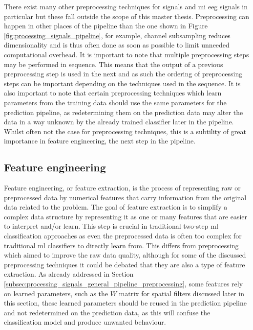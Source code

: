 There exist many other preprocessing techniques for signals and \gls{mi} \gls{eeg} signals in particular but these fall outside the scope of this master thesis.
Preprocessing can happen in other places of the pipeline than the one shown in Figure \ref{fig:processing_signals_pipeline}, for example, channel subsampling reduces dimensionality and is thus often done as soon as possible to limit unneeded computational overhead.
It is important to note that multiple preprocessing steps may be performed in sequence.
This means that the output of a previous preprocessing step is used in the next and as such the ordering of preprocessing steps can be important depending on the techniques used in the sequence.
It is also important to note that certain preprocessing techniques which learn parameters from the training data should use the same parameters for the prediction pipeline, as redetermining them on the prediction data may alter the data in a way unknown by the already trained classifier later in the pipeline.
Whilst often not the case for preprocessing techniques, this is a subtility of great importance in feature engineering, the next step in the pipeline.




\subsection{Feature engineering}
\label{subsec:processing_signals_general_pipeline_features}

Feature engineering, or feature extraction, is the process of representing raw or preprocessed data by numerical features that carry information from the original data related to the problem.
The goal of feature extraction is to simplify a complex data structure by representing it as one or many features that are easier to interpret and/or learn.
This step is crucial in traditional two-step \gls{ml} classification approaches as even the preprocessed data is often too complex for traditional \gls{ml} classifiers to directly learn from.
This differs from preprocessing which aimed to improve the raw data quality, although for some of the discussed preprocessing techniques it could be debated that they are also a type of feature extraction.
As already addressed in Section \ref{subsec:processing_signals_general_pipeline_preprocessing}, some features rely on learned parameters, such as the $W$ matrix for spatial filters discussed later in this section, these learned parameters should be reused in the prediction pipeline and not redetermined on the prediction data, as this will confuse the classification model and produce unwanted behaviour.

